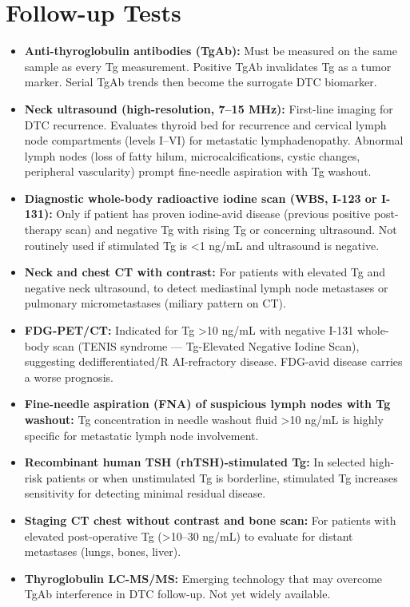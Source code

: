 \section*{Follow-up Tests}
\begin{itemize}
  \item \textbf{Anti-thyroglobulin antibodies (TgAb):} Must be measured on the same sample as every Tg measurement. Positive TgAb invalidates Tg as a tumor marker. Serial TgAb trends then become the surrogate DTC biomarker.
  \item \textbf{Neck ultrasound (high-resolution, 7--15 MHz):} First-line imaging for DTC recurrence. Evaluates thyroid bed for recurrence and cervical lymph node compartments (levels I--VI) for metastatic lymphadenopathy. Abnormal lymph nodes (loss of fatty hilum, microcalcifications, cystic changes, peripheral vascularity) prompt fine-needle aspiration with Tg washout.
  \item \textbf{Diagnostic whole-body radioactive iodine scan (WBS, I-123 or I-131):} Only if patient has proven iodine-avid disease (previous positive post-therapy scan) and negative Tg with rising Tg or concerning ultrasound. Not routinely used if stimulated Tg is <1 ng/mL and ultrasound is negative.
  \item \textbf{Neck and chest CT with contrast:} For patients with elevated Tg and negative neck ultrasound, to detect mediastinal lymph node metastases or pulmonary micrometastases (miliary pattern on CT).
  \item \textbf{FDG-PET/CT:} Indicated for Tg >10 ng/mL with negative I-131 whole-body scan (TENIS syndrome --- Tg-Elevated Negative Iodine Scan), suggesting dedifferentiated/R AI-refractory disease. FDG-avid disease carries a worse prognosis.
  \item \textbf{Fine-needle aspiration (FNA) of suspicious lymph nodes with Tg washout:} Tg concentration in needle washout fluid >10 ng/mL is highly specific for metastatic lymph node involvement.
  \item \textbf{Recombinant human TSH (rhTSH)-stimulated Tg:} In selected high-risk patients or when unstimulated Tg is borderline, stimulated Tg increases sensitivity for detecting minimal residual disease.
  \item \textbf{Staging CT chest without contrast and bone scan:} For patients with elevated post-operative Tg (>10--30 ng/mL) to evaluate for distant metastases (lungs, bones, liver).
  \item \textbf{Thyroglobulin LC-MS/MS:} Emerging technology that may overcome TgAb interference in DTC follow-up. Not yet widely available.
\end{itemize}


